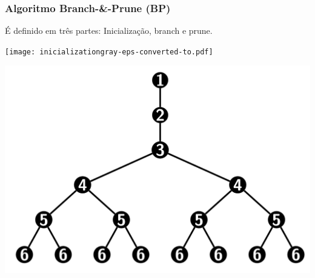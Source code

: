 \documentclass[10pt]{beamer}
\theoremstyle{plain}
\theoremstyle{definition}
\begin{document}
	\begin{frame}
		\frametitle{\normalsize Algoritmo Branch-\&-Prune (BP)} 
		{
			\small
			\begin{center}
				É definido em três partes: Inicialização, branch e prune.
				\\
				\begin{center}
					\begin{minipage}{0.01\linewidth}
						\hspace{0.05cm}
					\end{minipage}	
					\begin{minipage}{0.42\linewidth}
						\texttt{[image: inicializationgray-eps-converted-to.pdf]}
					\end{minipage}
					\begin{minipage}{0.2\linewidth}
						\includegraphics[width=1.5\linewidth]{ramificacoes.png}
					\end{minipage}
					\begin{minipage}{0.08\linewidth}
						\hspace{0.2cm}
					\end{minipage}
				\end{center}
			\end{center}
			
			
			
}
\end{frame}
\end{document}
